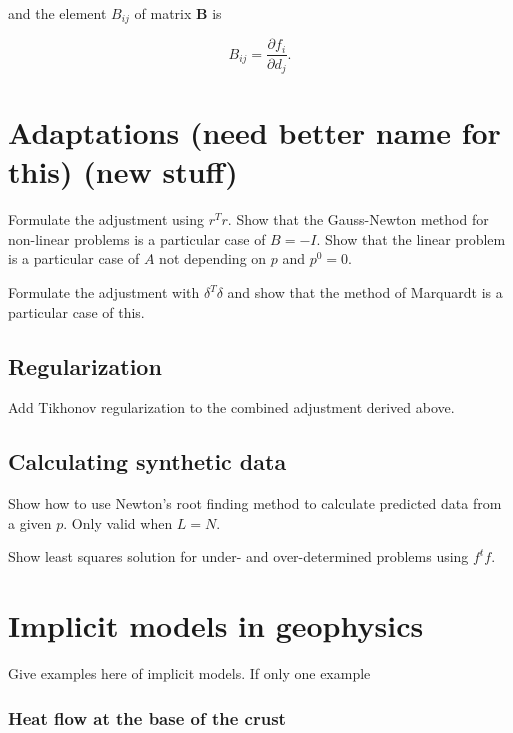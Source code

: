 \documentclass[onecolumn]{article}
\begin{document}
\noindent
and the element $B_{ij}$ of matrix $\mathbf{B}$ is

\begin{equation}
    B_{ij} = \dfrac{\partial f_i}{\partial d_j}.
    \label{eq:B}
\end{equation}

\section{Adaptations (need better name for this) (new stuff)}

Formulate the adjustment using $r^Tr$.
Show that the Gauss-Newton method
for non-linear problems
is a particular case of $B = -I$.
Show that the linear problem
is a particular case of $A$ not depending on $p$
and $p^0 = 0$.

Formulate the adjustment with $\delta^T\delta$
and show that the method of Marquardt
is a particular case of this.



\subsection{Regularization}

Add Tikhonov regularization to the combined adjustment derived above.



\subsection{Calculating synthetic data}

Show how to use Newton's root finding method to calculate predicted data from a
given $p$. Only valid when $L = N$.

Show least squares solution for under- and over-determined problems using
$f^tf$.

\section{Implicit models in geophysics}

Give examples here of implicit models.
If only one example


\subsubsection{Heat flow  at the base of the crust}
\end{document}
